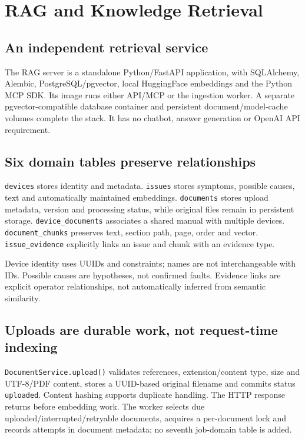 \chapter{RAG and Knowledge Retrieval}
\section{An independent retrieval service}
The RAG server is a standalone Python/FastAPI application, with SQLAlchemy, Alembic, PostgreSQL/pgvector, local HuggingFace embeddings and the Python MCP SDK. Its image runs either API/MCP or the ingestion worker. A separate pgvector-compatible database container and persistent document/model-cache volumes complete the stack. It has no chatbot, answer generation or OpenAI API requirement.
\begin{center}\end{center}
\section{Six domain tables preserve relationships}
\texttt{devices} stores identity and metadata. \texttt{issues} stores symptoms, possible causes, text and automatically maintained embeddings. \texttt{documents} stores upload metadata, version and processing status, while original files remain in persistent storage. \texttt{device\_documents} associates a shared manual with multiple devices. \texttt{document\_chunks} preserves text, section path, page, order and vector. \texttt{issue\_evidence} explicitly links an issue and chunk with an evidence type.

Device identity uses UUIDs and constraints; names are not interchangeable with IDs. Possible causes are hypotheses, not confirmed faults. Evidence links are explicit operator relationships, not automatically inferred from semantic similarity.
\section{Uploads are durable work, not request-time indexing}
\texttt{DocumentService.upload()} validates references, extension/content type, size and UTF-8/PDF content, stores a UUID-based original filename and commits status \texttt{uploaded}. Content hashing supports duplicate handling. The HTTP response returns before embedding work. The worker selects due uploaded/interrupted/retryable documents, acquires a per-document lock and records attempts in document metadata; no seventh job-domain table is added.


